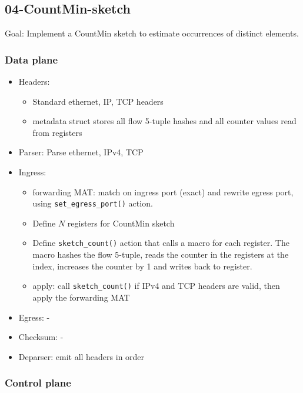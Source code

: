 \documentclass[11pt,oneside,a4paper]{article}
\begin{document}
\subsection{04-CountMin-sketch}

Goal: Implement a CountMin sketch to estimate occurrences of distinct elements.

\subsubsection{Data plane}

\vspace{-\topsep}
\begin{itemize}
	\setlength{\itemsep}{0pt}
	\setlength{\parskip}{0pt}
	\item Headers:
	\begin{itemize}
		\setlength{\itemsep}{0pt}
		\setlength{\parskip}{0pt}
		\item Standard ethernet, IP, TCP headers
		\item metadata struct stores all flow 5-tuple hashes and all counter values read from registers
	\end{itemize}
	\item Parser: Parse ethernet, IPv4, TCP
	\item Ingress:
	\begin{itemize}
		\setlength{\itemsep}{0pt}
		\setlength{\parskip}{0pt}
		\item forwarding MAT: match on ingress port (exact) and rewrite egress port, using \texttt{set\_egress\_port()} action.
		\item Define $N$ registers for CountMin sketch
		\item Define \texttt{sketch\_count()} action that calls a macro for each register. The macro hashes the flow 5-tuple, reads the counter in the registers at the index, increases the counter by 1 and writes back to register.
		\item apply: call \texttt{sketch\_count()} if IPv4 and TCP headers are valid, then apply the forwarding MAT
	\end{itemize}
	\item Egress: -
	\item Checksum: -
	\item Deparser: emit all headers in order
\end{itemize}
\vspace{-\topsep}

\subsubsection{Control plane}
\end{document}
